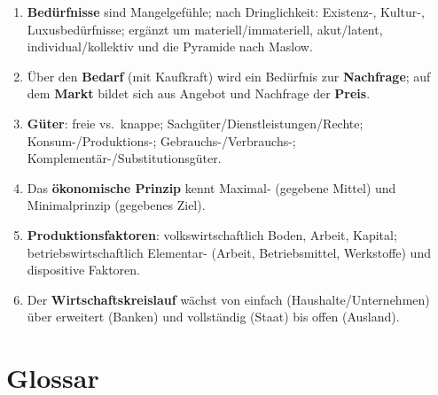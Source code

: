 \documentclass[11pt, a4paper]{article}
\begin{document}
\begin{enumerate}
  \item \textbf{Bedürfnisse} sind Mangelgefühle; nach Dringlichkeit: Existenz-, Kultur-,
    Luxusbedürfnisse; ergänzt um materiell/immateriell, akut/latent, individual/kollektiv
    und die Pyramide nach Maslow.
  \item Über den \textbf{Bedarf} (mit Kaufkraft) wird ein Bedürfnis zur \textbf{Nachfrage};
    auf dem \textbf{Markt} bildet sich aus Angebot und Nachfrage der \textbf{Preis}.
  \item \textbf{Güter}: freie vs.\ knappe; Sachgüter/Dienstleistungen/Rechte;
    Konsum-/Produktions-; Gebrauchs-/Verbrauchs-; Komplementär-/Substitutionsgüter.
  \item Das \textbf{ökonomische Prinzip} kennt Maximal- (gegebene Mittel) und Minimalprinzip
    (gegebenes Ziel).
  \item \textbf{Produktionsfaktoren}: volkswirtschaftlich Boden, Arbeit, Kapital;
    betriebswirtschaftlich Elementar- (Arbeit, Betriebsmittel, Werkstoffe) und dispositive
    Faktoren.
  \item Der \textbf{Wirtschaftskreislauf} wächst von einfach (Haushalte/Unternehmen) über
    erweitert (Banken) und vollständig (Staat) bis offen (Ausland).
\end{enumerate}

\newpage

\section*{Glossar}






\end{document}
